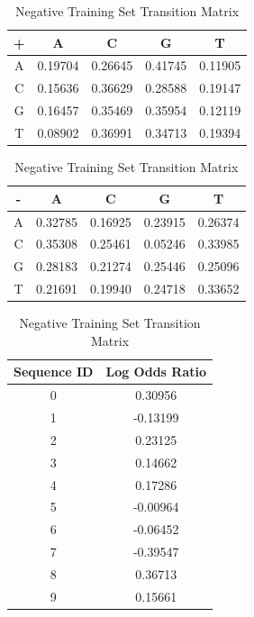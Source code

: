 \documentclass{acm_proc_article-sp}
\begin{document}
\begin{table}
\centering
\caption{Positive Training Set Transition Matrix}
\label{posmat}
\begin{tabular}{|c|c|c|c|c|} \hline
 +&A&C&G&T\\ \hline
A  &0.19704 &0.26645 &0.41745 &0.11905 \\ \hline
C  &0.15636  &0.36629  &0.28588  &0.19147 \\ \hline
G  &0.16457  &0.35469  &0.35954  &0.12119 \\ \hline
T  &0.08902  &0.36991  &0.34713  &0.19394\\ 
\hline\end{tabular}
\vspace{1.8em}
\caption{Negative Training Set Transition Matrix}
\label{negmat}
\begin{tabular}{|c|c|c|c|c|} \hline
- &A&C&G&T\\ \hline
A  &0.32785  &0.16925  &0.23915  &0.26374 \\ \hline
C  &0.35308  &0.25461  &0.05246  &0.33985 \\ \hline
G  &0.28183  &0.21274  &0.25446  &0.25096 \\ \hline
T  &0.21691  &0.19940  &0.24718  &0.33652 \\
\hline\end{tabular}
\end{table}

\begin{table}
\centering
\caption{Negative Training Set Transition Matrix}
\label{logodds}
\begin{tabular}{|c|c|} \hline
Sequence ID & Log Odds Ratio\\ \hline
0 & 0.30956 \\ \hline
1 & -0.13199 \\ \hline
2 & 0.23125 \\ \hline
3 & 0.14662 \\ \hline
4 & 0.17286 \\ \hline
5 & -0.00964 \\ \hline
6 & -0.06452 \\ \hline
7 & -0.39547 \\ \hline
8 & 0.36713 \\ \hline
9 & 0.15661 \\ 
\hline\end{tabular}
\end{table}
\end{document}
